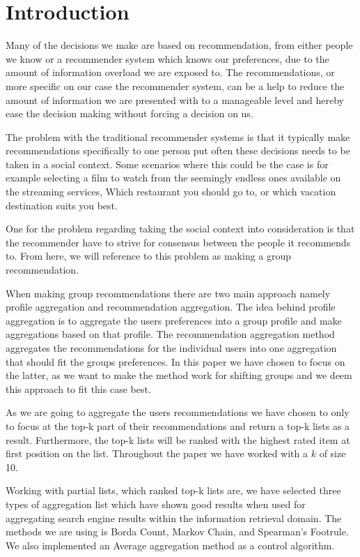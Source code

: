\section{Introduction}
Many of the decisions we make are based on recommendation, from either people we know or a recommender system which knows our preferences, due to the amount of information overload we are exposed to. The recommendations, or more specific on our case the recommender system, can be a help to reduce the amount of information we are presented with to a manageable level and hereby ease the decision making without forcing a decision on us. 

The problem with the traditional recommender systems is that it typically make recommendations specifically to one person put often these decisions needs to be taken in a social context. Some scenarios where this could be the case is for example selecting a film to watch from the seemingly endless ones available on the streaming services, Which restaurant you should go to, or which vacation destination suits you best. 

One for the problem regarding taking the social context into consideration is that the recommender have to strive for consensus between the people it recommends to. From here, we will reference to this problem as making a group recommendation.

When making group recommendations there are two main approach namely profile aggregation and recommendation aggregation. The idea behind profile aggregation is to aggregate the users preferences into a group profile and make aggregations based on that profile. The recommendation aggregation method aggregates the recommendations for the individual users into one aggregation that should fit the groups preferences. In this paper we have chosen to focus on the latter, as we want to make the method work for shifting groups and we deem this approach to fit this case best. 

As we are going to aggregate the users recommendations we have chosen to only to focus at the top-k part of their recommendations and return a top-k lists as a result. Furthermore, the top-k lists will be ranked with the highest rated item at first position on the list. Throughout the paper we have worked with a $k$ of size 10. 

Working with partial lists, which ranked top-k lists are, we have selected three types of aggregation list which have shown good results when used for aggregating search engine results within the information retrieval domain. The methods we are using is Borda Count, Markov Chain, and Spearman's Footrule. We also implemented an Average aggregation method as a control algorithm. 

